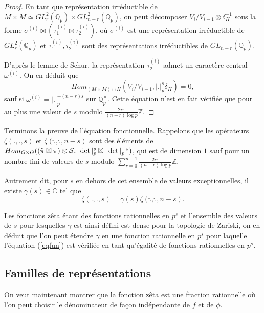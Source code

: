 \begin{proof}
En tant que représentation irréductible de $M \times M \simeq GL_r^2(\mathbb{Q}_p) \times GL_{n-r}^2(\mathbb{Q}_p)$, on peut décomposer $V_i/V_{i-1} \otimes \delta_H^{-1}$ sous la forme
$\sigma^{(i)} \boxtimes (\tau_1^{(i)} \boxtimes \tau_2^{(i)})$, où $\sigma^{(i)}$ est une représentation irréductible de $GL_r^2(\mathbb{Q}_p)$ et $\tau_1^{(i)}, \tau_2^{(i)}$ sont des représentations irréductibles de $GL_{n-r}(\mathbb{Q}_p)$.

D'après le lemme de Schur, la représentation $\tau_2^{(i)}$ admet un caractère central $\omega^{(i)}$. On en déduit que
\begin{equation}
Hom_{(M \times M) \cap H} (V_i/V_{i-1}, |.|_p^s\delta_H) = 0,
\end{equation}
sauf si $\omega^{(i)} = |.|_p^{-(n-r)s}$ sur $\mathbb{Q}_p^\times$. Cette équation n'est en fait vérifiée que pour au plus une valeur de $s$ modulo $\frac{2i\pi}{(n-r)\log p}\mathbb{Z}$.
\end{proof}

Terminons la preuve de l'équation fonctionnelle. Rappelons que les opérateurs $\zeta(., ., s)$ et $\zeta(\check{.}, \hat{.}, n-s)$ sont des éléments de $\operatorname{\mathnormal{Hom}}_{G \times G} ( (\tilde{\pi} \boxtimes \pi) \otimes \mathcal{S}, |\det|_p^s \boxtimes |\det|_p^{-s})$, qui est de dimension $1$ sauf pour un nombre fini de valeurs de $s$ modulo $\sum_{r=0}^{n-1}\frac{2i\pi}{(n-r)\log p}\mathbb{Z}$.

Autrement dit, pour $s$ en dehors de cet ensemble de valeurs exceptionnelles, il existe $\gamma(s) \in \mathbb{C}$ tel que
\begin{equation}
\label{eqfun}
\zeta(., ., s) = \gamma(s) \zeta(\check{.}, \hat{.}, n-s).
\end{equation}

Les fonctions zêta étant des fonctions rationnelles en $p^s$ et l'ensemble des valeurs de $s$ pour lesquelles $\gamma$ est ainsi défini est dense pour la topologie de Zariski, on en déduit que l'on peut étendre $\gamma$ en une fonction rationnelle en $p^s$ pour laquelle l'équation (\ref{eqfun}) est vérifiée en tant qu'égalité de fonctions rationnelles en $p^s$.

\subsection{Familles de représentations}

On veut maintenant montrer que la fonction zêta est une fraction rationnelle où l'on peut choisir le dénominateur de façon indépendante de $f$ et de $\phi$.

